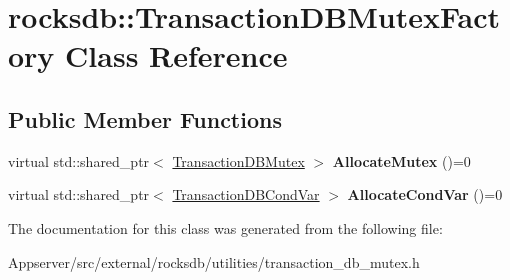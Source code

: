 \hypertarget{classrocksdb_1_1TransactionDBMutexFactory}{}\section{rocksdb\+:\+:Transaction\+D\+B\+Mutex\+Factory Class Reference}
\label{classrocksdb_1_1TransactionDBMutexFactory}
\subsection*{Public Member Functions}
\begin{DoxyCompactItemize}
\item 
virtual std\+::shared\+\_\+ptr$<$ \hyperlink{classrocksdb_1_1TransactionDBMutex}{Transaction\+D\+B\+Mutex} $>$ {\bfseries Allocate\+Mutex} ()=0\hypertarget{classrocksdb_1_1TransactionDBMutexFactory_a8a7fc3d9500c43097c798d2e02697940}{}\label{classrocksdb_1_1TransactionDBMutexFactory_a8a7fc3d9500c43097c798d2e02697940}

\item 
virtual std\+::shared\+\_\+ptr$<$ \hyperlink{classrocksdb_1_1TransactionDBCondVar}{Transaction\+D\+B\+Cond\+Var} $>$ {\bfseries Allocate\+Cond\+Var} ()=0\hypertarget{classrocksdb_1_1TransactionDBMutexFactory_ae275bbf5a9a81a3b4ae9414d0b01bd06}{}\label{classrocksdb_1_1TransactionDBMutexFactory_ae275bbf5a9a81a3b4ae9414d0b01bd06}

\end{DoxyCompactItemize}


The documentation for this class was generated from the following file\+:\begin{DoxyCompactItemize}
\item 
Appserver/src/external/rocksdb/utilities/transaction\+\_\+db\+\_\+mutex.\+h\end{DoxyCompactItemize}
